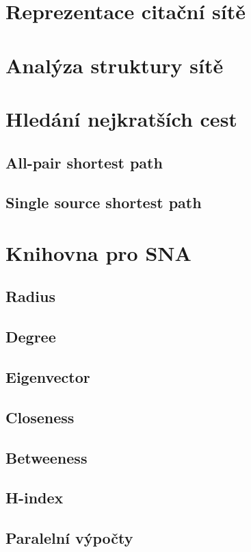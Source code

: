 \documentclass[12pt,titlepage]{report}
\begin{document}
\section{Reprezentace citační sítě}
\section{Analýza struktury sítě}

\section{Hledání nejkratších cest}
\subsection{All-pair shortest path}
\subsection{Single source shortest path}

\section{Knihovna pro SNA}
\subsection{Radius}
\subsection{Degree}
\subsection{Eigenvector}
\subsection{Closeness}
\subsection{Betweeness}
\subsection{H-index}

\subsection{Paralelní výpočty}
\end{document}

